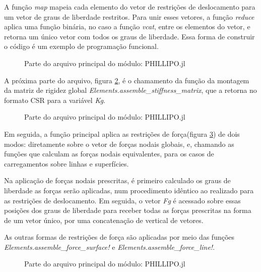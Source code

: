 A função \emph{map} mapeia cada elemento do vetor de restrições de deslocamento para um vetor de graus de liberdade restritos. Para unir esses vetores, a função \emph{reduce} aplica uma função binária, no caso a função \emph{vcat}, entre os elementos do vetor, e retorna um único vetor com todos os graus de liberdade. Essa forma de construir o código é um exemplo de programação funcional.

\begin{figure}[hbtp]
    \caption{Parte do arquivo principal do módulo: PHILLIPO.jl}
    
    \label{fig:phillipo.jl_3}
\end{figure}

A próxima parte do arquivo, figura \ref{fig:phillipo.jl_4}, é o chamamento da função da montagem da matriz de rigidez global \emph{Elements.assemble\_stiffness\_matrix}, que a retorna no formato CSR para a variável \emph{Kg}. 

\begin{figure}[hbtp]
    \caption{Parte do arquivo principal do módulo: PHILLIPO.jl}
    
    \label{fig:phillipo.jl_4}
\end{figure}

Em seguida, a função principal aplica as restrições de força(figura \ref{fig:phillipo.jl_5}) de dois modos: diretamente sobre o vetor de forças nodais globais, e, chamando as funções que calculam as forças nodais equivalentes, para os casos de carregamentos sobre linhas e superfícies.

Na aplicação de forças nodais prescritas, é primeiro calculado os graus de liberdade as forças serão aplicadas, num procedimento idêntico ao realizado para as restrições de deslocamento. Em seguida, o vetor \emph{Fg} é acessado sobre essas posições dos graus de liberdade para receber todas as forças prescritas na forma de um vetor único, por uma concatenação de vertical de vetores.

As outras formas de restrições de força são aplicadas por meio das funções \emph{Elements.assemble\_force\_surface!} e \emph{Elements.assemble\_force\_line!}.

\begin{figure}[hbtp]
    \caption{Parte do arquivo principal do módulo: PHILLIPO.jl}
    
    \label{fig:phillipo.jl_5}
\end{figure}

